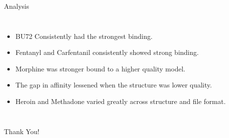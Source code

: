 \documentclass[aspectratio=169]{beamer}
\begin{document}
\begin{frame}{Analysis}
    \begin{columns}
         \footnotesize
            \begin{itemize}
                \item BU72 Consistently had the strongest binding.
                \item Fentanyl and Carfentanil consistently showed strong binding.
                \item Morphine was stronger bound to a higher quality model.
                \item The gap in affinity lessened when the structure was lower quality.
                \item Heroin and Methadone varied greatly across structure and file format.
            
      \end{itemize}
    \end{columns}
\end{frame}

\begin{frame}{Thank You!}
\end{frame}
\end{document}
